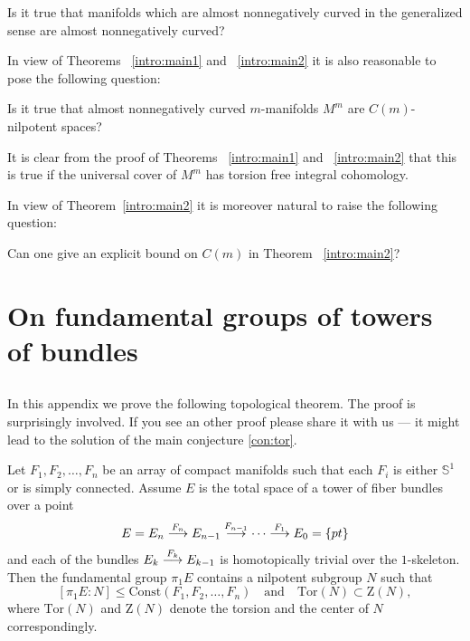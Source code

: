 \documentclass{amsart}
\begin{document}
\begin{quest}
Is it true  that  manifolds which are almost nonnegatively curved in the generalized sense
are almost nonnegatively curved?
\end{quest}


In view of Theorems ~\ref{intro:main1} and ~\ref{intro:main2} it is
also reasonable to pose the following question:

\begin{quest}
Is it true that almost nonnegatively curved $m$-manifolds $M^m$
are $C(m)$-nilpotent spaces?
\end{quest}

It is clear from the proof of Theorems ~\ref{intro:main1} and ~\ref{intro:main2}
that this is true if the universal cover
of $M^m$ has torsion free integral cohomology.

In view of Theorem~\ref{intro:main2} it is moreover natural to raise
the following question:
\begin{quest}
Can one give an explicit bound on $C(m)$ in Theorem ~\ref{intro:main2}?
\end{quest}

\appendix
\section{On fundamental groups of towers of bundles}

\subsection{}
In this appendix we prove the following topological theorem.
The proof is surprisingly involved.
If you see an other proof please share it with us --- it might lead to the solution of the main conjecture \ref{con:tor}.%

\begin{thm}\label{thm:top}
Let $F_1,F_2,\dots,F_n$ be an array of compact manifolds 
such that each $F_i$ is either $\mathbb{S}^{1}$ or is simply connected. 
Assume $E$ is the total space of a tower of fiber bundles over a point
$$E=E_n\buildrel {F_n}\over \longrightarrow E_{n-1}\buildrel {F_{n-1}}\over\longrightarrow\dots\buildrel {F_1}\over\longrightarrow E_0=\{pt\}$$
and each of the bundles $E_k\buildrel {F_k}\over \longrightarrow E_{k-1}$ is homotopically trivial over the $1$-skeleton. 
Then the fundamental group $\pi_1E$ contains a nilpotent subgroup $N$ such that
$$[\pi_1E:N]\le \mathrm{Const}(F_1,F_2,\dots,F_n)\quad\text{and}\quad\mathrm{Tor}(N)\subset \mathrm{Z}(N),$$
where $\mathrm{Tor}(N)$ and $\mathrm{Z}(N)$ denote the torsion and the center of $N$ correspondingly.
\end{thm}
\end{document}
